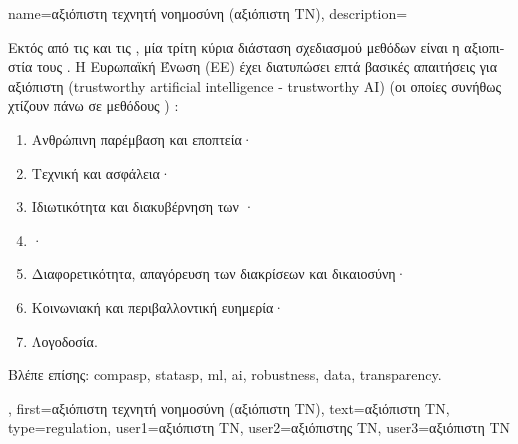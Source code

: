 {name={\foreignlanguage{greek}{αξιόπιστη τεχνητή νοημοσύνη (αξιόπιστη ΤΝ)}},
	description={\foreignlanguage{greek}{Εκτός από τις}  \foreignlanguage{greek}{και τις} 
		, \foreignlanguage{greek}{μία τρίτη κύρια διάσταση σχεδιασμού μεθόδων}  
		 \foreignlanguage{greek}{είναι η αξιοπιστία 
		τους} 
		\cite{pfau2024engineeringtrustworthyaideveloper}. 
		\foreignlanguage{greek}{Η Ευρωπαϊκή Ένωση (ΕΕ) έχει διατυπώσει επτά βασικές απαιτήσεις για αξιόπιστη}  
		 (trustworthy artificial intelligence - trustworthy AI) \foreignlanguage{greek}{(οι οποίες 
		συνήθως χτίζουν πάνω σε μεθόδους} ) \cite{ALTAIEU}: 
		\begin{enumerate}[label=\arabic*)]
			\item \foreignlanguage{greek}{Ανθρώπινη παρέμβαση και εποπτεία·}
			\item \foreignlanguage{greek}{Τεχνική}  \foreignlanguage{greek}{και ασφάλεια·}
			\item \foreignlanguage{greek}{Ιδιωτικότητα και διακυβέρνηση των} ·
			\item {}·
			\item \foreignlanguage{greek}{Διαφορετικότητα, απαγόρευση των διακρίσεων και δικαιοσύνη·}
			\item \foreignlanguage{greek}{Κοινωνιακή και περιβαλλοντική ευημερία·}
			\item \foreignlanguage{greek}{Λογοδοσία.}
		\end{enumerate}
		\foreignlanguage{greek}{Βλέπε επίσης:} \gls{compasp}, \gls{statasp}, \gls{ml}, \gls{ai}, \gls{robustness}, \gls{data}, \gls{transparency}.},
	first={\foreignlanguage{greek}{αξιόπιστη τεχνητή νοημοσύνη (αξιόπιστη ΤΝ)}},
	text={\foreignlanguage{greek}{αξιόπιστη ΤΝ}},
	type=regulation,
	user1={\foreignlanguage{greek}{αξιόπιστη ΤΝ}}, %
  	user2={\foreignlanguage{greek}{αξιόπιστης ΤΝ}}, %
	user3={\foreignlanguage{greek}{αξιόπιστη ΤΝ}} %
}

